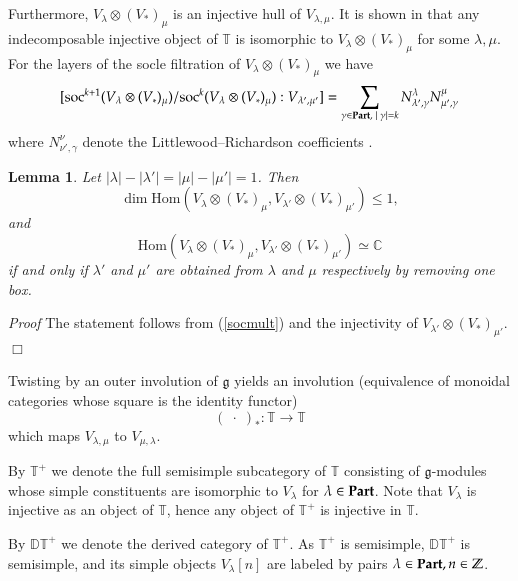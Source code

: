 \documentclass[11pt]{amsart}
\newcounter{theorem}
\newtheorem{lemma}[theo]{Lemma}
\renewenvironment{proof}{ \emph{Proof}}{$\Box$}
\newcommand{\TT}{\mathbb{T}}
\renewcommand{\gg}{\mathfrak{g}}
\newcommand{\soc}{\mathrm{soc}}
\newcommand{\Hom}{\mathrm{Hom}}
\newcommand{\field}[1]{\mathbb{#1}}
\begin{document}
Furthermore, $V_\lambda\otimes (V_*)_\mu$  is an injective hull of
$V_{\lambda,\mu}$. It is shown in \cite{DPS} that any indecomposable
injective object of $\TT$ is isomorphic to $V_\lambda\otimes (V_*)_\mu$ for
some $\lambda,\mu$.
For the layers of the socle filtration of $V_\lambda\otimes (V_*)_\mu$ we have
\begin{equation}\label{socmult}
[\soc^{k+1}(V_\lambda\otimes  (V_*)_\mu)/\soc^{k}(V_\lambda\otimes(V_*)_\mu):V_{\lambda',\mu'}]=
\sum_{\gamma\in\bold{Part},\;|\;\gamma|=k}N^\lambda_{\lambda',\gamma}N^\mu_{\mu',\gamma}
\end{equation}
where $N^\nu_{\nu',\gamma}$ denote the Littlewood--Richardson
coefficients \cite{PStyr}. 
\begin{lemma}\label{dimhom} Let $|\lambda|-|\lambda'|=|\mu|-|\mu'|=1$.
Then 
$$\operatorname{dim}\Hom(V_\lambda\otimes (V_*)_\mu,V_{\lambda'}\otimes (V_*)_{\mu'})\leq 1,$$
and 
$$\Hom(V_\lambda\otimes (V_*)_\mu,V_{\lambda'}\otimes(V_*)_{\mu'})\simeq\mathbb C$$
if and only if $\lambda'$ and $\mu'$ are obtained from $\lambda$ and
$\mu$ respectively by removing one box.
\end{lemma}
\begin{proof} The statement follows from (\ref{socmult}) and the 
  injectivity of $V_{\lambda'}\otimes (V_*)_{\mu'}$. 
\end{proof}

Twisting by an outer involution of $\gg$ yields an involution (equivalence
of monoidal categories whose square is the identity
functor) $$(\;\cdot\;)_*: \mathbb T\to\mathbb T$$ which maps
$V_{\lambda,\mu}$ to $V_{\mu,\lambda}$.

By $\field{T}^+$ we denote the full semisimple subcategory
of $\field{T}$ consisting of $\mathfrak g$-modules whose simple constituents are isomorphic to $V_\lambda$ for
$\lambda\in\bold{Part}$.
Note that $V_\lambda$ is injective as an object of $\mathbb T$, hence
any object of $\mathbb T^+$ is injective in $\mathbb T$.


By $\mathbb {DT}^+$ we denote the derived category of $\mathbb T^+$. As $\mathbb T^+$ is semisimple, 
$\mathbb {DT}^+$ is semisimple, and its simple objects $V_\lambda[n]$
are labeled by pairs $\lambda\in\bold{Part},n\in\mathbb Z$.
\end{document}
